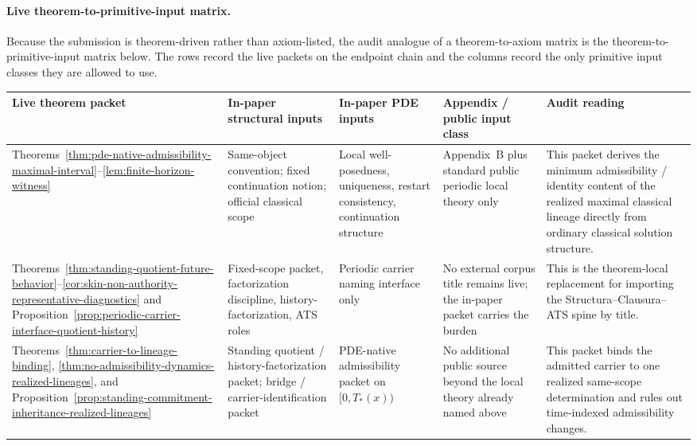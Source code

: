 \paragraph{Live theorem-to-primitive-input matrix.}
Because the submission is theorem-driven rather than axiom-listed, the audit analogue of a theorem-to-axiom matrix is the theorem-to-primitive-input matrix below. The rows record the live packets on the endpoint chain and the columns record the only primitive input classes they are allowed to use.

\begin{center}
\footnotesize
\renewcommand{\arraystretch}{1.14}
\setlength{\tabcolsep}{4pt}
\begin{tabularx}{0.98\textwidth}{@{}L{0.22\textwidth}L{0.17\textwidth}L{0.17\textwidth}L{0.16\textwidth}Y@{}}
\toprule
\textbf{Live theorem packet} & \textbf{In-paper structural inputs} & \textbf{In-paper PDE inputs} & \textbf{Appendix / public input class} & \textbf{Audit reading}\\
\midrule
Theorems~\ref{thm:pde-native-admissibility-maximal-interval}--\ref{lem:finite-horizon-witness} & Same-object convention; fixed continuation notion; official classical scope & Local well-posedness, uniqueness, restart consistency, continuation structure & Appendix~B plus standard public periodic local theory only & This packet derives the minimum admissibility / identity content of the realized maximal classical lineage directly from ordinary classical solution structure.\\
Theorems~\ref{thm:standing-quotient-future-behavior}--\ref{cor:skin-non-authority-representative-diagnostics} and Proposition~\ref{prop:periodic-carrier-interface-quotient-history} & Fixed-scope packet, factorization discipline, history-factorization, ATS roles & Periodic carrier naming interface only & No external corpus title remains live; the in-paper packet carries the burden & This is the theorem-local replacement for importing the Structura--Clausura--ATS spine by title.\\
Theorems~\ref{thm:carrier-to-lineage-binding}, \ref{thm:no-admissibility-dynamics-realized-lineages}, and Proposition~\ref{prop:standing-commitment-inheritance-realized-lineages} & Standing quotient / history-factorization packet; bridge / carrier-identification packet & PDE-native admissibility packet on $[0,T_*(x))$ & No additional public source beyond the local theory already named above & This packet binds the admitted carrier to one realized same-scope determination and rules out time-indexed admissibility changes.\\

\end{tabularx}
\end{center}

